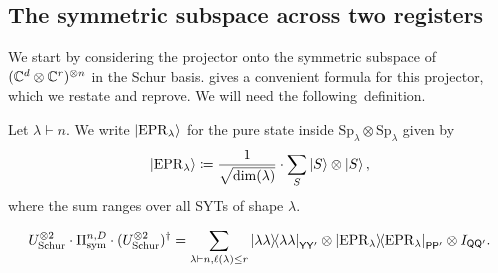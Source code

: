\subsection{The symmetric subspace across two registers}

We start by considering the projector onto the symmetric subspace of $(\mathbb C^d \otimes \mathbb C^r)^{\otimes n}$ in the Schur basis. \cite[Lemma 2.13]{TWZ25} gives a convenient formula for this projector, which we restate and reprove. We will need the following~definition. 

\begin{definition}
    Let $\lambda \vdash n$. We write $\ket{\mathrm{EPR}_{\lambda}}$ for the pure state inside $\mathrm{Sp}_{\lambda} \otimes \mathrm{Sp}_{\lambda}$ given by
    \begin{equation*}
        \ket{\mathrm{EPR}_{\lambda}} \coloneqq \frac{1}{\sqrt{\dim(\lambda)}} \cdot \sum_{S} \ket{S} \otimes \ket{S},
    \end{equation*}
    where the sum ranges over all SYTs of shape $\lambda$.
\end{definition}

\begin{lemma}\label{lem:double-schur-pi-sym}
    \begin{equation} \label{eq:double-schur-pi-sym}
        U_{\mathrm{Schur}}^{\otimes 2} \cdot \Pi_{\mathrm{sym}}^{n, D} \cdot (U_{\mathrm{Schur}}^{\otimes 2})^\dagger
        = \sum_{\lambda \vdash n, \ell(\lambda) \leq r} \ketbra{\lambda\lambda}{\lambda\lambda}_{\mathsf{Y}\mathsf{Y'}} \otimes \ketbra{\mathrm{EPR}_{\lambda}}{\mathrm{EPR}_{\lambda}}_{\mathsf{P}\mathsf{P'}} \otimes I_{\mathsf{Q}\mathsf{Q'}}.
    \end{equation}
\end{lemma}

